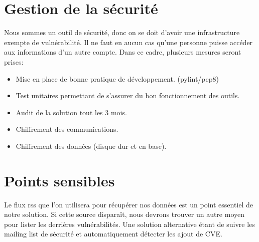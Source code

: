 \section{Gestion de la sécurité}
Nous sommes un outil de sécurité, donc on se doit d’avoir une infrastructure exempte de vulnérabilité. Il ne faut en aucun cas qu’une personne puisse accéder aux informations d’un autre compte.
Dans ce cadre, plusieurs mesures seront prises:
\begin{itemize}
\item Mise en place de bonne pratique de développement. (pylint/pep8)
\item Test unitaires permettant de s’assurer du bon fonctionnement des outils.
\item Audit de la solution tout les 3 mois.
\item Chiffrement des communications.
\item Chiffrement des données (disque dur et en base).  
\end{itemize}


\section{Points sensibles}
Le flux rss que l’on utilisera pour récupérer nos données est un point essentiel de notre solution. Si cette source disparaît, nous devrons trouver un autre moyen pour lister les derrières vulnérabilités. Une solution alternative étant de suivre les mailing list de sécurité et automatiquement détecter les ajout de CVE.\\